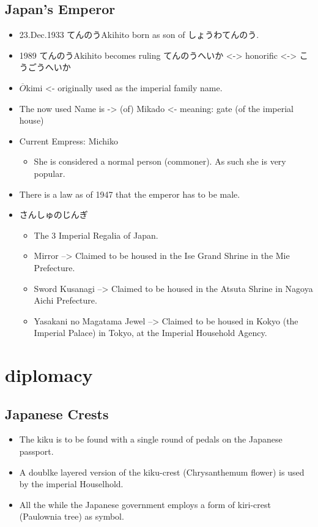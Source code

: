 \documentclass{article}
\newcommand\tabni[1][0.2cm]{\hspace*{#1}}
\begin{document}
\subsection{Japan's Emperor}
\begin{itemize}
    \item 23.Dec.1933 てんのうAkihito born as son of しょうわてんのう.
    \item 1989 てんのうAkihito becomes ruling てんのうへいか <-> honorific <-> こうごうへいか
    \item $\overline{O}$kimi <- originally used as the imperial family name.
    \item The now used Name is -> (of) Mikado <- meaning: gate (of the imperial house)
    \item Current Empress: Michiko
    \begin{itemize}
        \item She is considered a normal person (commoner). As such she is very popular.
    \end{itemize}
    \item There is a law as of 1947 that the emperor has to be male.
    \item さんしゅのじんぎ
    \begin{itemize}
        \item The 3 Imperial Regalia of Japan.
        \item Mirror --> Claimed to be housed in the Ise Grand Shrine in the Mie Prefecture.
        \item Sword Kusanagi --> Claimed to be housed in the Atsuta Shrine in Nagoya Aichi Prefecture.
        \item Yasakani no Magatama Jewel --> Claimed to be housed in Kokyo (the Imperial Palace) in Tokyo, at the Imperial Household Agency.
    \end{itemize}
\end{itemize}
\section{ \tabni diplomacy }
\subsection{Japanese Crests}
\begin{itemize}
    \item The kiku is to be found with a single round of pedals on the Japanese passport.
    \item A doublke layered version of the kiku-crest (Chrysanthemum flower) is used by the imperial Houselhold. 
    \item All the while the Japanese government employs a form of kiri-crest (Paulownia tree) as symbol.
\end{itemize}
\end{document}
